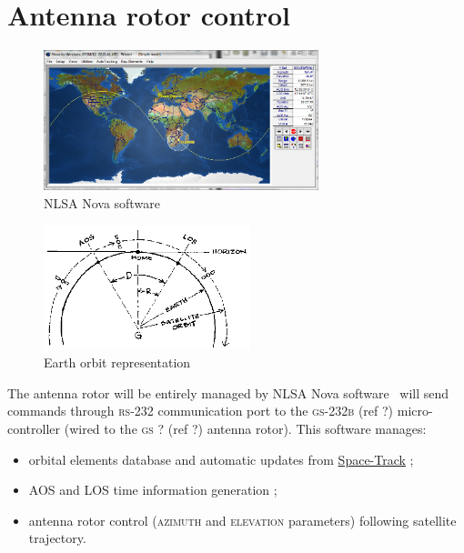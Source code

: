 \documentclass[a4paper]{report}
\begin{document}
\section{Antenna rotor control}

\begin{figure}[h]
  \begin{center}
  \includegraphics[width=8cm]{pictures/nova3.png}
  \end{center}
\caption{NLSA Nova software}
\label{fig:nlsa_nova}
\end{figure}

\begin{figure}[h]
  \begin{center}
  \includegraphics[width=6cm]{pictures/orbitdra.png}
  \end{center}
\caption{Earth orbit representation}
\label{fig:aos_los}
\end{figure}

The antenna rotor will be entirely managed by NLSA Nova software~\cite{nova_um} will send commands through \textsc{rs-232} communication port to the \textsc{gs-232b} (ref ?) micro-controller (wired to the \textsc{gs ?} (ref ?) antenna rotor). This software manages:
\begin {itemize}
\item {orbital elements database and automatic updates from \href{https://www.space-track.org}{Space-Track} ;}
\item {AOS and LOS time information generation ;}
\item {antenna rotor control (\textsc{azimuth} and \textsc{elevation} parameters) following satellite trajectory.}
\end {itemize}
\end{document}
